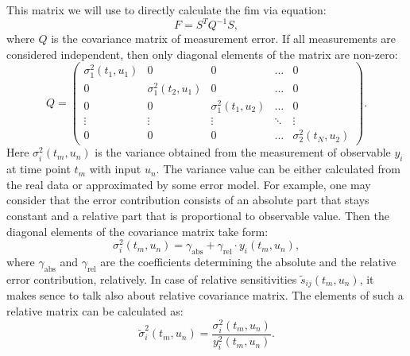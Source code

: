 \documentclass[10pt,A4paper]{article}
\begin{document}
This matrix we will use to directly calculate the \ac{fim} via equation:
\begin{equation}
    F = S^T Q^{-1} S,
\end{equation}
where $Q$ is the covariance matrix of measurement error.
If all measurements are considered independent, then only diagonal elements of the matrix are non-zero: 
\begin{equation}
    Q = 
\begin{pmatrix}
    \sigma_{1}^2(t_1, u_1) & 0                      & 0                      & \dots  & 0                     \\
    0                      & \sigma_{1}^2(t_2, u_1) & 0                      & \dots  & 0                     \\
    0                      & 0                      & \sigma_{1}^2(t_1, u_2) & \dots  & 0                     \\
    \vdots                 & \vdots                 & \vdots                 & \ddots & \vdots                \\
    0                      & 0                      & 0                      & \dots  & \sigma_{2}^2(t_N, u_2)
\end{pmatrix}.
\label{eq:covar_matrix}
\end{equation}
Here $\sigma_{i}^2 (t_m, u_n)$ is the variance obtained from the measurement of observable $y_i$ at time point $t_m$ with input $u_n$.
The variance value can be either calculated from the real data or approximated by some error model.
For example, one may consider that the error contribution consists of an absolute part that stays constant and a relative part that is proportional to observable value.
Then the diagonal elements of the covariance matrix take form:
\begin{equation}
    \sigma_{i}^2 (t_m, u_n) = \gamma_\text{abs} + \gamma_\text{rel} \cdot y_i(t_m, u_n),
\end{equation}
where $\gamma_\text{abs}$ and $\gamma_\text{rel}$ are the coefficients determining the absolute and the relative error contribution, relatively.
In case of relative sensitivities $\tilde{s}_{ij} (t_m, u_n)$, it makes sence to talk also about relative covariance matrix.
The elements of such a relative matrix can be calculated as:
\begin{equation}
    \tilde{\sigma}_{i}^2 (t_m, u_n) = \frac{\sigma_{i}^2 (t_m, u_n)}{y^2_i(t_m, u_n)}.
\end{equation} 
%
\end{document}
